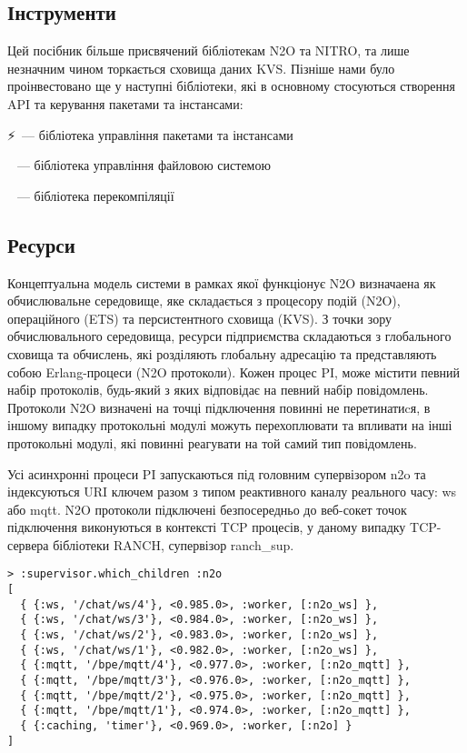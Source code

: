 \subsection{Інструменти}

Цей посібник більше присвячений бібліотекам N2O та NITRO, та лише незначним
чином торкається сховища даних KVS. Пізніше нами було проінвестовано ще у
наступні бібліотеки, які в основному стосуються створення API та керування
пакетами та інстансами:

\setmainfont{Segoe UI Emoji}⚡\setmainfont{Geometria}\ --- бібліотека управління пакетами та інстансами

\setmainfont{Segoe UI Emoji}📁\setmainfont{Geometria}\ --- бібліотека управління файловою системою

\setmainfont{Segoe UI Emoji}🐋\setmainfont{Geometria}\ --- бібліотека перекомпіляції

\newpage
\subsection{Ресурси}

Концептуальна модель системи в рамках якої функціонує N2O визначаена як обчислювальне середовище,
яке складається з процесору подій (N2O), операційного (ETS) та персистентного сховища (KVS).
З точки зору обчислювального середовища, ресурси підприємства складаються з глобального
 сховища та обчислень, які розділяють глобальну адресацію та представляють собою
Erlang-процеси (N2O протоколи). Кожен процес PI, може містити певний набір протоколів,
будь-який з яких відповідає на певний набір повідомлень. Протоколи N2O визначені на
точці підключення повинні не перетинатиcя, в іншому випадку протокольні модулі можуть
перехоплювати та впливати на інші протокольні модулі, які повинні реагувати на той
самий тип повідомлень.

Усі асинхронні процеси PI запускаються під головним супервізором n2o та індексуються
URI ключем разом з типом реактивного каналу реального часу: ws або mqtt. N2O протоколи
підключені безпосередньо до веб-сокет точок підключення виконуються в контексті TCP
процесів, у даному випадку TCP-сервера бібліотеки RANCH, супервізор ranch_sup.

\begin{lstlisting}
> :supervisor.which_children :n2o
[
  { {:ws, '/chat/ws/4'}, <0.985.0>, :worker, [:n2o_ws] },
  { {:ws, '/chat/ws/3'}, <0.984.0>, :worker, [:n2o_ws] },
  { {:ws, '/chat/ws/2'}, <0.983.0>, :worker, [:n2o_ws] },
  { {:ws, '/chat/ws/1'}, <0.982.0>, :worker, [:n2o_ws] },
  { {:mqtt, '/bpe/mqtt/4'}, <0.977.0>, :worker, [:n2o_mqtt] },
  { {:mqtt, '/bpe/mqtt/3'}, <0.976.0>, :worker, [:n2o_mqtt] },
  { {:mqtt, '/bpe/mqtt/2'}, <0.975.0>, :worker, [:n2o_mqtt] },
  { {:mqtt, '/bpe/mqtt/1'}, <0.974.0>, :worker, [:n2o_mqtt] },
  { {:caching, 'timer'}, <0.969.0>, :worker, [:n2o] }
]
\end{lstlisting}

